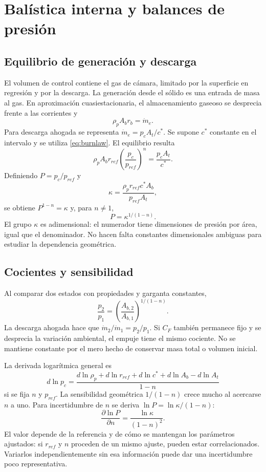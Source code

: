\chapter{Balística interna y balances de presión}\label{ch:12}
\section{Equilibrio de generación y descarga}
El volumen de control contiene el gas de cámara, limitado por la superficie en regresión y por la descarga. La generación desde el sólido es una entrada de masa al gas. En aproximación cuasiestacionaria, el almacenamiento gaseoso se desprecia frente a las corrientes y
\[
 \rho_pA_b r_b=\dot m_e.
\]
Para descarga ahogada se representa $\dot m_e=p_cA_t/c^*$. Se supone $c^*$ constante en el intervalo y se utiliza \eqref{eq:burnlaw}. El equilibrio resulta
\[
 \rho_pA_br_{ref}\left(\frac{p_c}{p_{ref}}\right)^n
 =\frac{p_cA_t}{c^*}.
\]
Definiendo $P=p_c/p_{ref}$ y
\[
 \kappa=\frac{\rho_pr_{ref}c^*A_b}{p_{ref}A_t},
\]
se obtiene $P^{1-n}=\kappa$ y, para $n\ne1$,
\begin{equation}\label{eq:solidP}
 \boxed{P=\kappa^{1/(1-n)}}.
\end{equation}
El grupo $\kappa$ es adimensional: el numerador tiene dimensiones de presión por área, igual que el denominador. No hacen falta constantes dimensionales ambiguas para estudiar la dependencia geométrica.
\section{Cocientes y sensibilidad}
Al comparar dos estados con propiedades y garganta constantes,
\begin{equation}\label{eq:solidratio}
 \frac{p_2}{p_1}=\left(\frac{A_{b,2}}{A_{b,1}}\right)^{1/(1-n)}.
\end{equation}
La descarga ahogada hace que $\dot m_2/\dot m_1=p_2/p_1$. Si $C_F$ también permanece fijo y se desprecia la variación ambiental, el empuje tiene el mismo cociente. No se mantiene constante por el mero hecho de conservar masa total o volumen inicial.

La derivada logarítmica general es
\begin{equation}
 d\ln p_c=\frac{d\ln\rho_p+d\ln r_{ref}+d\ln c^*
 +d\ln A_b-d\ln A_t}{1-n}
\end{equation}
si se fija $n$ y $p_{ref}$. La sensibilidad geométrica $1/(1-n)$ crece mucho al acercarse $n$ a uno. Para incertidumbre de $n$ se deriva $\ln P=\ln\kappa/(1-n)$:
\[
 \frac{\partial\ln P}{\partial n}=\frac{\ln\kappa}{(1-n)^2}.
\]
El valor depende de la referencia y de cómo se mantengan los parámetros ajustados: si $r_{ref}$ y $n$ proceden de un mismo ajuste, pueden estar correlacionados. Variarlos independientemente sin esa información puede dar una incertidumbre poco representativa.
